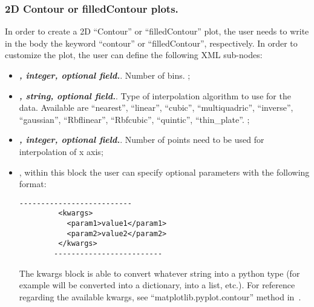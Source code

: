 \subsubsection{2D Contour or filledContour plots.}
In order to create a 2D ``Contour'' or ``filledContour'' plot, the user needs to
write in the  body the keyword ``contour'' or ``filledContour'',
respectively.
%
In order to customize the plot, the user can define the following XML sub-nodes:
  \begin{itemize}
  \item {}\textbf{\textit{, integer, optional field.}}.
  Number of bins.
  ;
  \item {}\textbf{\textit{, string, optional field.}}.
  Type of interpolation algorithm to use for the data.
  Available are ``nearest'', ``linear'', ``cubic'', ``multiquadric'',
  ``inverse'', ``gaussian'', ``Rbflinear'', ``Rbfcubic'', ``quintic'',
  ``thin\_plate''.
  ;
  \item {}\textbf{\textit{, integer, optional field.}}.
  Number of points need to be used for interpolation of x axis;
  \item \textit{}, within this block the user can specify optional
  parameters with the following format:
        \begin{lstlisting}[style=XML]
        --------------------------
         <kwargs>
           <param1>value1</param1>
           <param2>value2</param2>
         </kwargs>
        -------------------------
       \end{lstlisting}
  The kwargs block is able to convert whatever string into a python type (for
  example  will be converted into a
  dictionary,  into a list, etc.).
  For reference regarding the available kwargs, see
  ``matplotlib.pyplot.contour'' method in~\cite{MatPlotLib}.
    \end{itemize}


